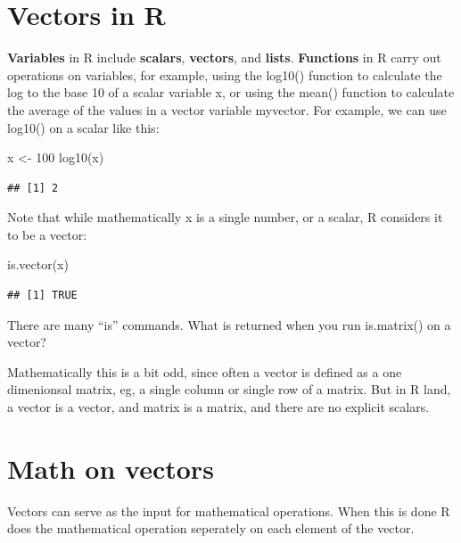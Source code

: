 \documentclass[
]{book}
\newenvironment{Shaded}{\begin{snugshade}}{\end{snugshade}}
\newcommand{\DecValTok}[1]{\textcolor[rgb]{0.00,0.00,0.81}{#1}}
\newcommand{\FunctionTok}[1]{\textcolor[rgb]{0.00,0.00,0.00}{#1}}
\newcommand{\NormalTok}[1]{#1}
\newcommand{\OtherTok}[1]{\textcolor[rgb]{0.56,0.35,0.01}{#1}}
\begin{document}
\hypertarget{vectors-in-r}{%
\section{Vectors in R}\label{vectors-in-r}}

\textbf{Variables} in R include \textbf{scalars}, \textbf{vectors}, and \textbf{lists}. \textbf{Functions} in R carry out operations on variables, for example, using the log10() function to calculate the log to the base 10 of a scalar variable x, or using the mean() function to calculate the average of the values in a vector variable myvector. For example, we can use log10() on a scalar like this:

\begin{Shaded}
\begin{Highlighting}[]
\NormalTok{x }\OtherTok{\textless{}{-}} \DecValTok{100}
\FunctionTok{log10}\NormalTok{(x)}
\end{Highlighting}
\end{Shaded}

\begin{verbatim}
## [1] 2
\end{verbatim}

Note that while mathematically x is a single number, or a scalar, R considers it to be a vector:

\begin{Shaded}
\begin{Highlighting}[]
\FunctionTok{is.vector}\NormalTok{(x)}
\end{Highlighting}
\end{Shaded}

\begin{verbatim}
## [1] TRUE
\end{verbatim}

There are many ``is'' commands. What is returned when you run is.matrix() on a vector?

Mathematically this is a bit odd, since often a vector is defined as a one dimenionsal matrix, eg, a single column or single row of a matrix. But in R land, a vector is a vector, and matrix is a matrix, and there are no explicit scalars.

\hypertarget{math-on-vectors}{%
\section{Math on vectors}\label{math-on-vectors}}

Vectors can serve as the input for mathematical operations. When this is done R does the mathematical operation seperately on each element of the vector.
\end{document}
